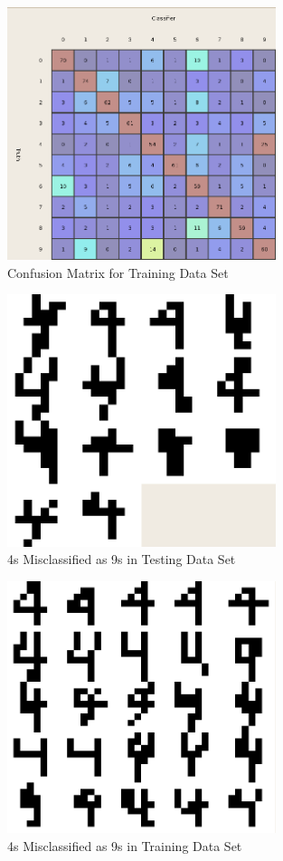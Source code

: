 \documentclass{article}
\begin{document}
\begin{figure}
\centering
\includegraphics[width=0.7\textwidth]{ConfusionMatrixTraining.png}
\caption{Confusion Matrix for Training Data Set}
\label{trainconfusion}
\end{figure}

\begin{figure}
\centering
\includegraphics[width=0.7\textwidth]{4-9-testing.png}
\caption{4s Misclassified as 9s in Testing Data Set}
\label{4_9_missclass_testing}
\end{figure}

\begin{figure}
\centering
\includegraphics[width=0.7\textwidth]{4-9-training.png}
\caption{4s Misclassified as 9s in Training Data Set}
\label{4_9_missclass_training}
\end{figure}
\end{document}
